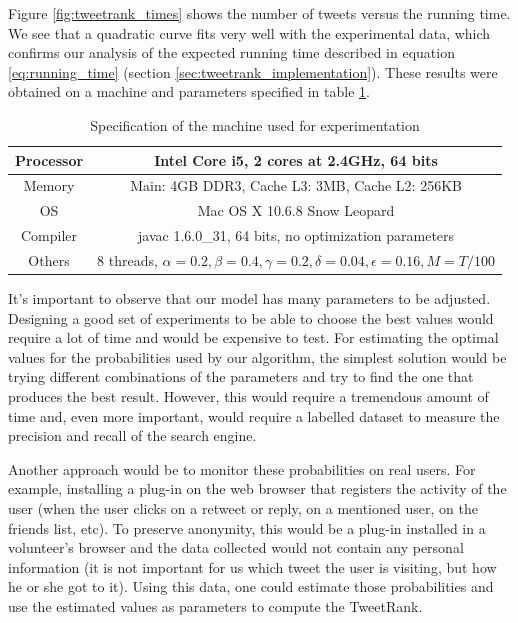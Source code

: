 Figure \ref{fig:tweetrank_times} shows the number of tweets versus the running time. We see that a quadratic curve fits very well with the experimental data, which confirms our analysis of the expected running time described in equation \ref{eq:running_time} (section \ref{sec:tweetrank_implementation}). These results were obtained on a machine and parameters specified in table \ref{table:machine_spec}. 

\begin{table}
\centering
\begin{tabular}{|c|c|}
\hline Processor & Intel Core i5, 2 cores at 2.4GHz, 64 bits \\
\hline Memory & Main: 4GB DDR3, Cache L3: 3MB, Cache L2: 256KB \\
\hline OS &  Mac OS X 10.6.8 Snow Leopard \\
\hline Compiler & javac 1.6.0\_31, 64 bits, no optimization parameters \\
\hline Others & 8 threads, $\alpha = 0.2, \beta = 0.4, \gamma = 0.2, \delta = 0.04, \epsilon = 0.16, M = T/100$ \\
\hline
\end{tabular}
\caption{Specification of the machine used for experimentation}
\label{table:machine_spec}
\end{table}

It's important to observe that our model has many parameters to be adjusted. Designing a good set of experiments to be able to choose the best values would require a lot of time and would be expensive to test. For estimating the optimal values for the probabilities used by our algorithm, the simplest solution would be trying different combinations of the parameters and try to find the one that produces the best result. However, this would require a tremendous amount of time and, even more important, would require a labelled dataset to measure the precision and recall of the search engine.

Another approach would be to monitor these probabilities on real users. For example, installing a plug-in on the web browser that registers the activity of the user (when the user clicks on a retweet or reply, on a mentioned user, on the friends list, etc). To preserve anonymity, this would be a plug-in installed in a volunteer's browser and the data collected would not contain any personal information (it is not important for us which tweet the user is visiting, but how he or she got to it). Using this data, one could estimate those probabilities and use the estimated values as parameters to compute the TweetRank.